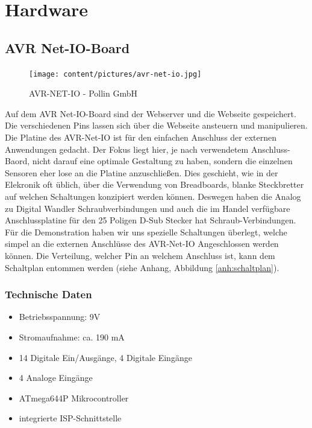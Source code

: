 
\chapter{Hardware}
\section{AVR Net-IO-Board}
\begin{figure}[h]
\centering
\texttt{[image: content/pictures/avr-net-io.jpg]}
\caption{AVR-NET-IO - Pollin GmbH}
\label{fig:B3}
\end{figure}

Auf dem AVR Net-IO-Board sind der Webserver und die Webseite gespeichert. Die
verschiedenen Pins lassen sich über die Webseite ansteuern und manipulieren.
Die Platine des AVR-Net-IO ist für den einfachen Anschluss der externen
Anwendungen gedacht. Der Fokus liegt hier, je nach verwendetem Anschluss-Baord,
nicht darauf eine optimale Gestaltung zu haben, sondern die einzelnen Sensoren
eher lose an die Platine anzuschließen. Dies geschieht, wie in der Elekronik oft
üblich, über die Verwendung von Breadboards, blanke Steckbretter auf
welchen Schaltungen konzipiert werden können. Deswegen haben die Analog zu Digital
Wandler Schraubverbindungen und auch die im Handel verfügbare Anschlussplatine
für den 25 Poligen D-Sub Stecker hat Schraub-Verbindungen. Für die Demonstration
haben wir uns spezielle Schaltungen überlegt, welche simpel an die externen
Anschlüsse des AVR-Net-IO Angeschlossen werden können. Die Verteilung, welcher
Pin an welchem Anschluss ist, kann dem Schaltplan entommen werden (siehe
Anhang, Abbildung \ref{anh:schaltplan}).

\subsection{Technische Daten}
\begin{itemize}
  \item Betriebsspannung: 9V 
  \item Stromaufnahme: ca. 190 mA
  \item 14 Digitale Ein/Ausgänge, 4 Digitale Eingänge
  \item 4 Analoge Eingänge
  \item ATmega644P Mikrocontroller
  \item integrierte ISP-Schnittstelle
\end{itemize}

